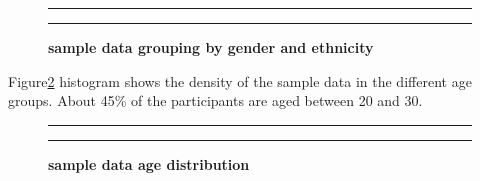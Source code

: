 \documentclass[]{article}
\begin{document}
\begin{figure}[!ht]
    \hrule
    \caption{ \textbf{sample data grouping by gender and ethnicity} }
    \begin{center}
    \end{center}
    \label{fig:sample}
    \hrule
\end{figure}

\noindent Figure\ref{fig:age-dist} histogram shows the density of the
sample data in the different age groups. About 45\% of the participants
are aged between 20 and 30.

\begin{figure}[!ht]
    \hrule
    \caption{ \textbf{sample data age distribution} }
    \begin{center}
    \end{center}
    \label{fig:age-dist}
    \hrule
\end{figure}
\end{document}
